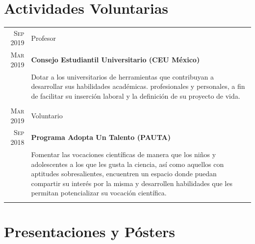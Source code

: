 \documentclass[a4paper,10pt]{article} %
\begin{document}

\section{Actividades Voluntarias}

\begin{tabular}{r|p{11cm}}

	
	\textsc{Sep 2019} & Profesor\\
	\textsc{Mar 2019} &\footnotesize{\textbf{Consejo Estudiantil Universitario (CEU México)}}\\
	&\footnotesize{Dotar a los universitarios de herramientas que contribuyan a desarrollar sus habilidades académicas. profesionales y personales, a fin de facilitar su inserción laboral y la definición de su proyecto de vida.}\\
	\multicolumn{2}{c}{} \\	
	
	
	\textsc{Mar 2019} & Voluntario\\
	\textsc{Sep 2018} &\footnotesize{\textbf{Programa Adopta Un Talento (PAUTA)}}\\
	&\footnotesize{Fomentar las vocaciones científicas de manera que los niños y adolescentes a los que les gusta la ciencia, así como aquellos con aptitudes sobresalientes, encuentren un espacio donde puedan compartir su interés por la misma y desarrollen habilidades que les permitan potencializar su vocación científica.}\\
	\multicolumn{2}{c}{} \\
	

\end{tabular}


\section{Presentaciones y Pósters}
\end{document}
